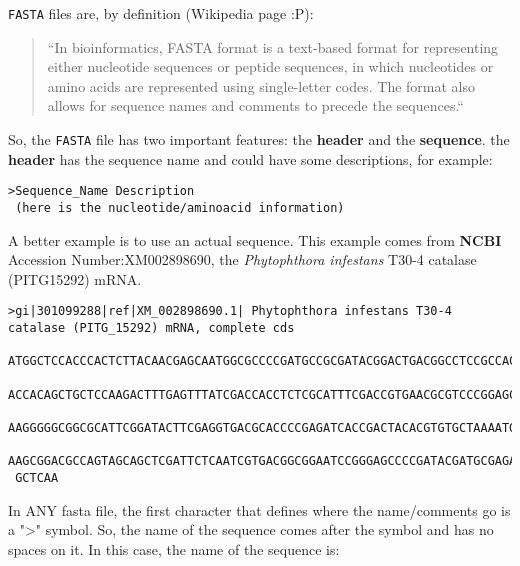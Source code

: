 \documentclass[letterpaper]{article}\usepackage[]{graphicx}\usepackage[]{color}
\makeatletter
\newenvironment{kframe}{%
 \def\at@end@of@kframe{}%
 \ifinner\ifhmode%
  \def\at@end@of@kframe{\end{minipage}}%
  \begin{minipage}{\columnwidth}%
 \fi\fi%
 \def\FrameCommand##1{\hskip\@totalleftmargin \hskip-\fboxsep
 \colorbox{shadecolor}{##1}\hskip-\fboxsep
     \hskip-\linewidth \hskip-\@totalleftmargin \hskip\columnwidth}%
 \MakeFramed {\advance\hsize-\width
   \@totalleftmargin\z@ \linewidth\hsize
   \@setminipage}}%
 {\par\unskip\endMakeFramed%
 \at@end@of@kframe}
\newenvironment{knitrout}{}{} %
\makeatother
\begin{document}
\texttt{FASTA} files are, by definition (Wikipedia page :P):
\begin{quotation}
``In bioinformatics, FASTA format is a text-based format for representing either nucleotide sequences or peptide sequences, in which nucleotides or amino acids are represented using single-letter codes. The format also allows for sequence names and comments to precede the sequences.``
\end{quotation}

So, the \texttt{FASTA} file has two important features: the \textbf{header} and the \textbf{sequence}. the \textbf{header} has the sequence name and could have some descriptions, for example:

\begin{knitrout}\footnotesize
{}\color{fgcolor}\begin{kframe}
\begin{verbatim}
>Sequence_Name Description
 (here is the nucleotide/aminoacid information)
\end{verbatim}
\end{kframe}
\end{knitrout}


A better example is to use an actual sequence. This example comes from \textbf{NCBI} Accession Number:XM002898690, the \emph{Phytophthora infestans} T30-4 catalase (PITG15292) mRNA. 

\begin{knitrout}\footnotesize
{}\color{fgcolor}\begin{kframe}
\begin{verbatim}
>gi|301099288|ref|XM_002898690.1| Phytophthora infestans T30-4 catalase (PITG_15292) mRNA, complete cds
 ATGGCTCCACCCACTCTTACAACGAGCAATGGCGCCCCGATGCCGCGATACGGACTGACGGCCTCCGCCACTGCTGGGTCCACTGG
 ACCACAGCTGCTCCAAGACTTTGAGTTTATCGACCACCTCTCGCATTTCGACCGTGAACGCGTCCCGGAGCGCGTCGTGCACGCCA
 AAGGGGGCGGCGCATTCGGATACTTCGAGGTGACGCACCCCGAGATCACCGACTACACGTGTGCTAAAATGTTTTCGAATGCCGGC
 AAGCGGACGCCAGTAGCAGCTCGATTCTCAATCGTGACGGCGGAATCCGGGAGCCCCGATACGATGCGAGACCCGCGGGGCTTCGC
 GCTCAA
\end{verbatim}
\end{kframe}
\end{knitrout}


In ANY fasta file, the first character that defines where the name/comments go is a ">" symbol. So, the name of the sequence comes after the symbol and has no spaces on it. In this case, the name of the sequence is:
\end{document}
